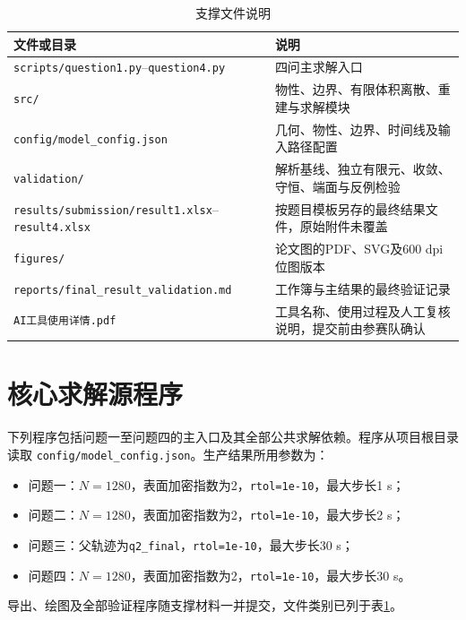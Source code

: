 \begin{table}[H]
  \caption{支撑文件说明}
  \label{tab:support-files}
  \centering
  \begin{tabularx}{0.96\textwidth}{lX}
    \toprule
    文件或目录 & 说明 \\
    \midrule
    \texttt{scripts/question1.py}--\texttt{question4.py} & 四问主求解入口 \\
    \texttt{src/} & 物性、边界、有限体积离散、重建与求解模块 \\
    \texttt{config/model\_config.json} & 几何、物性、边界、时间线及输入路径配置 \\
    \texttt{validation/} & 解析基线、独立有限元、收敛、守恒、端面与反例检验 \\
    \texttt{results/submission/result1.xlsx}--\texttt{result4.xlsx} & 按题目模板另存的最终结果文件，原始附件未覆盖 \\
    \texttt{figures/} & 论文图的PDF、SVG及600 dpi位图版本 \\
    \texttt{reports/final\_result\_validation.md} & 工作簿与主结果的最终验证记录 \\
    \texttt{AI工具使用详情.pdf} & 工具名称、使用过程及人工复核说明，提交前由参赛队确认 \\
    \bottomrule
  \end{tabularx}
\end{table}

\section{核心求解源程序}

下列程序包括问题一至问题四的主入口及其全部公共求解依赖。程序从项目根目录读取
\texttt{config/model\_config.json}。生产结果所用参数为：
\begin{itemize}[nosep,leftmargin=2em]
  \item 问题一：$N=1280$，表面加密指数为2，\texttt{rtol=1e-10}，最大步长1 s；
  \item 问题二：$N=1280$，表面加密指数为2，\texttt{rtol=1e-10}，最大步长2 s；
  \item 问题三：父轨迹为\texttt{q2\_final}，\texttt{rtol=1e-10}，最大步长30 s；
  \item 问题四：$N=1280$，表面加密指数为2，\texttt{rtol=1e-10}，最大步长30 s。
\end{itemize}
导出、绘图及全部验证程序随支撑材料一并提交，文件类别已列于表\ref{tab:support-files}。


